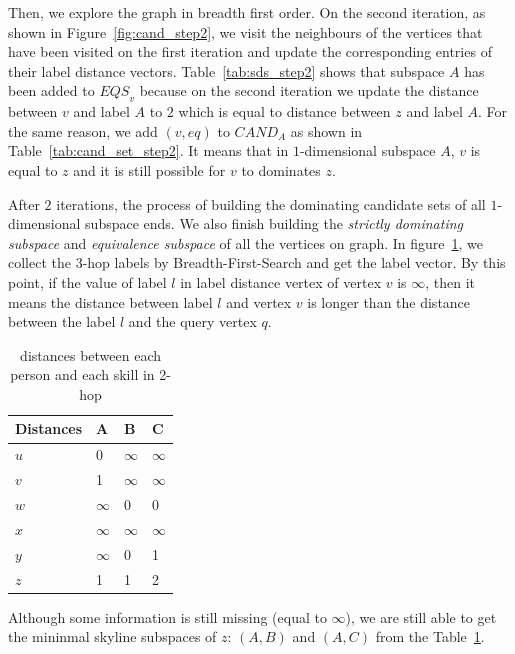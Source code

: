 Then, we explore the graph in breadth first order. On the second iteration, as shown in Figure~\ref{fig:cand_step2}, we visit the neighbours of the vertices that have been visited on the first iteration and update the corresponding entries of their label distance vectors. Table~\ref{tab:sds_step2} shows that subspace $A$ has been added to $\mathit{EQS}_v$ because on the second iteration we update the distance between $v$ and label $A$ to $2$ which is equal to distance between $z$ and label $A$. For the same reason, we add $(v, eq)$ to $\mathit{CAND}_A$ as shown in Table~\ref{tab:cand_set_step2}. It means that in $1$-dimensional subspace $A$, $v$ is equal to $z$ and it is still possible for $v$ to dominates $z$.

After $2$ iterations, the process of building the  dominating candidate sets of all $1$-dimensional subspace ends. We also finish building the \emph{strictly dominating subspace} and \emph{equivalence subspace} of all the vertices on graph. In figure~\ref{tab:d_hops_distance}, we collect the $3$-hop labels by Breadth-First-Search and get the label vector. By this point, if the value of label $l$ in label distance vertex of vertex $v$ is $\infty$, then it means the distance between label $l$ and vertex $v$ is longer than the distance between the label $l$ and the query vertex $q$.

\begin{table}[h]
    \centering
    \begin{tabular}{llll}
    \hline
    Distances & A & B & C \\ \hline
    $u$       & 0 & $\infty$ & $\infty$ \\ \hline
    $v$       & 1 & $\infty$ & $\infty$ \\ \hline
    $w$       & $\infty$ & 0 & 0 \\ \hline
    $x$       & $\infty$ & $\infty$ & $\infty$ \\ \hline
    $y$       & $\infty$ & 0 & 1 \\ \hline
    $z$       & 1 & 1 & 2 \\ \hline
    \end{tabular}
    \caption{\label{tab:d_hops_distance} distances between each person and each skill in 2-hop}
\end{table}

Although some information is still missing (equal to $\infty$), we are still able to get the mininmal skyline subspaces of $z$: $(A, B)$ and $(A, C)$ from the Table~\ref{tab:d_hops_distance}.

